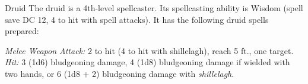\documentclass[10pt,a4paper,twoside,bg=print,twocolumn,openany,nodeprecatedcode]{dndbook}
\begin{document}
\begin{DndMonster}[float=t]{Druid}
\DndMonsterBasics[
armor-class = {11 (16 with \textit{barkskin})},
hit-points = {\DndDice{5d8 + 5}},
speed = {30 ft.}
]
\DndMonsterAbilityScores[
 str = 10,
 dex = 12,
 con = 13,
 int = 12,
 wis = 15,
 cha = 11
]
\DndMonsterDetails[
skills = {Medicine +4, Nature +3, Perception +4},
languages = {Druidic plus any two languages},
challenge = 2,
]
The druid is a 4th-level spellcaster. Its spellcasting ability is Wisdom (spell save DC 12, 4 to hit with spell attacks). It has the following druid spells prepared:
\begin{DndMonsterSpells}
\end{DndMonsterSpells}
\textsl{Melee Weapon Attack:} 2 to hit (4 to hit with shillelagh), reach 5 ft., one target. \textsl{Hit:} 3 (1d6) bludgeoning damage, 4 (1d8) bludgeoning damage if wielded with two hands, or 6 (1d8 + 2) bludgeoning damage with \textit{shillelagh}.

\end{DndMonster}
\end{document}

